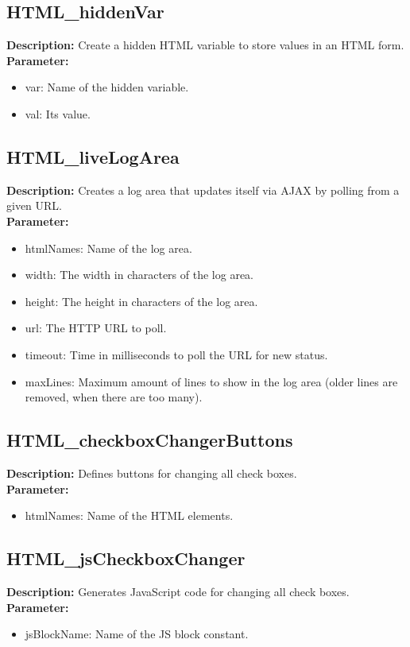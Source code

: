 \subsection{HTML\_hiddenVar}
\textbf{Description:} Create a hidden HTML variable to store values in an HTML form.\\
\textbf{Parameter:}
\begin{itemize}
\item var: Name of the hidden variable.
\item val: Its value.
\end{itemize}

\subsection{HTML\_liveLogArea}
\textbf{Description:} Creates a log area that updates itself via AJAX by polling from a given URL.\\
\textbf{Parameter:}
\begin{itemize}
\item htmlNames: Name of the log area.
\item width: The width in characters of the log area.
\item height: The height in characters of the log area.
\item url: The HTTP URL to poll.
\item timeout: Time in milliseconds to poll the URL for new status.
\item maxLines: Maximum amount of lines to show in the log area (older lines are removed, when there are too many).
\end{itemize}

\subsection{HTML\_checkboxChangerButtons}
\textbf{Description:} Defines buttons for changing all check boxes.\\
\textbf{Parameter:}
\begin{itemize}
\item htmlNames: Name of the HTML elements.
\end{itemize}

\subsection{HTML\_jsCheckboxChanger}
\textbf{Description:} Generates JavaScript code for changing all check boxes.\\
\textbf{Parameter:}
\begin{itemize}
\item jsBlockName: Name of the JS block constant.
\end{itemize}


